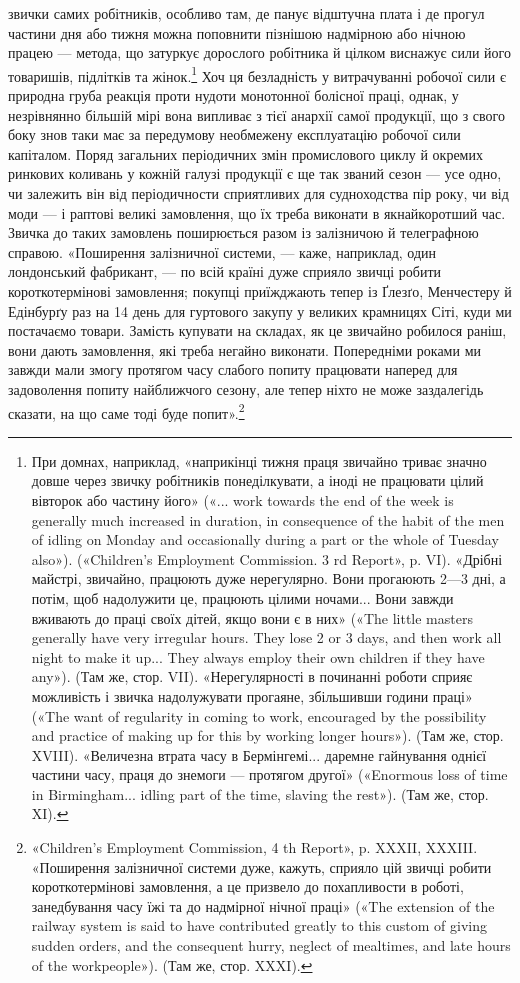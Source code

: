 звички самих робітників, особливо там, де панує відштучна плата
і де прогул частини дня або тижня можна поповнити пізнішою
надмірною або нічною працею — метода, що затуркує дорослого
робітника й цілком виснажує сили його товаришів, підлітків та
жінок.\footnote{
При домнах, наприклад, «наприкінці тижня праця звичайно
триває значно довше через звичку робітників понеділкувати, а іноді не
працювати цілий вівторок або частину його» («... work towards the
end of the week is generally much increased in duration, in consequence
of the habit of the men of idling on Monday and occasionally during a part
or the whole of Tuesday also»). («Children’s Employment Commission.
3 rd Report», p. VI). «Дрібні майстрі, звичайно, працюють дуже нерегулярно.
Вони прогаюють 2—3 дні, а потім, щоб надолужити це, працюють
цілими ночами... Вони завжди вживають до праці своїх дітей, якщо вони
є в них» («The little masters generally have very irregular hours. They
lose 2 or 3 days, and then work all night to make it up... They always employ
their own children if they have any»). (Там же, стор. VII). «Нерегулярності
в починанні роботи сприяє можливість і звичка надолужувати прогаяне,
збільшивши години праці» («The want of regularity in coming to work,
encouraged by the possibility and practice of making up for this by working
longer hours»). (Там же, стор. XVIII). «Величезна втрата часу в Бермінгемі... даремне гайнування
однієї частини часу, праця до знемоги — протягом другої» («Enormous loss of time in Birmingham...
idling part of
the time, slaving the rest»). (Там же, стор. XI).
} Хоч ця безладність у витрачуванні робочої сили є
природна груба реакція проти нудоти монотонної болісної
праці, однак, у незрівнянно більшій мірі вона випливає з тієї
анархії самої продукції, що з свого боку знов таки має за передумову необмежену експлуатацію робочої
сили капіталом. Поряд
загальних періодичних змін промислового циклу й окремих ринкових коливань у кожній галузі продукції
є ще так званий сезон — усе одно, чи залежить він від періодичности сприятливих
для судноходства пір року, чи від моди — і раптові великі замовлення, що їх треба виконати в
якнайкоротший час. Звичка до
таких замовлень поширюється разом із залізничою й телеграфною справою. «Поширення залізничної
системи, — каже, наприклад, один лондонський фабрикант, — по всій країні дуже сприяло
звичці робити короткотермінові замовлення; покупці приїжджають тепер із Ґлезґо, Менчестеру й
Едінбурґу раз на 14 день
для гуртового закупу у великих крамницях Сіті, куди ми постачаємо товари. Замість купувати на
складах, як це звичайно робилося раніш, вони дають замовлення, які треба негайно виконати.
Попередніми роками ми завжди мали змогу протягом часу
слабого попиту працювати наперед для задоволення попиту найближчого сезону, але тепер ніхто не може
заздалегідь сказати,
на що саме тоді буде попит».\footnote{
«Children’s Employment Commission, 4 th Report», p. XXXII,
XXXIII. «Поширення залізничної системи дуже, кажуть, сприяло цій
звичці робити короткотермінові замовлення, а це призвело до похапливости в роботі, занедбування часу
їжі та до надмірної нічної праці»
(«The extension of the railway system is said to have contributed greatly
to this custom of giving sudden orders, and the consequent hurry, neglect
of mealtimes, and late hours of the workpeople»). (Там же, стор. XXXI).
}